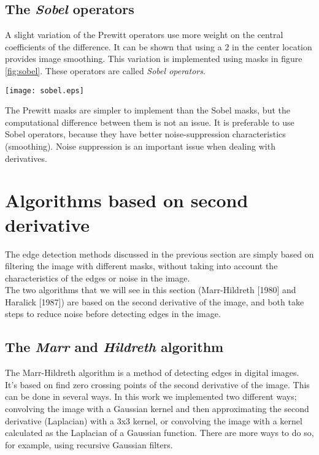 \documentclass{ipol}
\numberwithin{equation}{section}
\numberwithin{table}{section}
\numberwithin{figure}{section}
\begin{document}
\subsection{The \textit{Sobel} operators}

A slight variation of the Prewitt operators use more weight on the central coefficients of the 
difference. It can be shown that using a $2$ in the center location provides image smoothing. This
variation is implemented using masks in figure \ref{fig:sobel}. These operators are called 
\textit{Sobel operators}.\\

\begin{SCfigure}[2][!h]
	\centering
	\texttt{[image: sobel.eps]}
	\caption{\textit{Sobel} 2-D masks of size $3\times3$.}
	\label{fig:sobel}
\end{SCfigure}

The Prewitt masks are simpler to implement than the Sobel masks, but the computational difference
between them is not an issue. It is preferable to use Sobel operators, because they have better
noise-suppression characteristics (smoothing). Noise suppression is an important issue when dealing
with derivatives.\\

\section{Algorithms based on second derivative}
\label{sec:second}

The edge detection methods discussed in the previous section are simply based on filtering the 
image with different masks, without taking into account the characteristics of the edges or 
noise in the image.\\

The two algorithms that we will see in this section (Marr-Hildreth [1980] and Haralick [1987]) 
are based on the second derivative of the image, and both take steps to reduce noise before 
detecting edges in the image.\\

\subsection{The \textit{Marr} and \textit{Hildreth} algorithm}

The Marr-Hildreth algorithm is a method of detecting edges in digital 
images. It's based on find zero crossing points of the second derivative
of the image. This can be done in several ways. In this work we implemented 
two different ways; convolving the image with a Gaussian kernel and then 
approximating the second derivative (Laplacian) with a 3x3 kernel, or 
convolving the image with a kernel calculated as the Laplacian of a 
Gaussian function. There are more ways to do so, for example, using 
recursive Gaussian filters.\\ %
\end{document}
